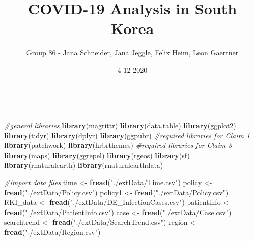 \documentclass[
]{article}
\title{COVID-19 Analysis in South Korea}
\author{Group 86 - Jana Schneider, Jana Jeggle, Felix Heim, Leon
Gaertner}
\date{4 12 2020}
\newenvironment{Shaded}{\begin{snugshade}}{\end{snugshade}}
\newcommand{\CommentTok}[1]{\textcolor[rgb]{0.56,0.35,0.01}{\textit{#1}}}
\newcommand{\KeywordTok}[1]{\textcolor[rgb]{0.13,0.29,0.53}{\textbf{#1}}}
\newcommand{\NormalTok}[1]{#1}
\newcommand{\StringTok}[1]{\textcolor[rgb]{0.31,0.60,0.02}{#1}}
\begin{document}
\maketitle

~

\begin{Shaded}
\begin{Highlighting}[]
\CommentTok{\#general libraries}
\KeywordTok{library}\NormalTok{(magrittr)}
\KeywordTok{library}\NormalTok{(data.table)}
\KeywordTok{library}\NormalTok{(ggplot2)}
\KeywordTok{library}\NormalTok{(tidyr)}
\KeywordTok{library}\NormalTok{(dplyr)}
\KeywordTok{library}\NormalTok{(ggpubr)}
\CommentTok{\#required libraries for Claim 1}
\KeywordTok{library}\NormalTok{(patchwork)}
\KeywordTok{library}\NormalTok{(hrbrthemes)}
\CommentTok{\#required libraries for Claim 3}
\KeywordTok{library}\NormalTok{(maps)}
\KeywordTok{library}\NormalTok{(ggrepel)}
\KeywordTok{library}\NormalTok{(rgeos)}
\KeywordTok{library}\NormalTok{(sf)}
\KeywordTok{library}\NormalTok{(rnaturalearth)}
\KeywordTok{library}\NormalTok{(rnaturalearthdata)}
\end{Highlighting}
\end{Shaded}

\begin{Shaded}
\begin{Highlighting}[]
\CommentTok{\#import data files}
\NormalTok{time \textless{}{-}}\StringTok{ }\KeywordTok{fread}\NormalTok{(}\StringTok{"./extData/Time.csv"}\NormalTok{)}
\NormalTok{policy \textless{}{-}}\StringTok{ }\KeywordTok{fread}\NormalTok{(}\StringTok{"./extData/Policy.csv"}\NormalTok{)}
\NormalTok{policy1 \textless{}{-}}\StringTok{ }\KeywordTok{fread}\NormalTok{(}\StringTok{"./extData/Policy.csv"}\NormalTok{)}
\NormalTok{RKI\_data \textless{}{-}}\StringTok{ }\KeywordTok{fread}\NormalTok{(}\StringTok{"./extData/DE\_InfectionCases.csv"}\NormalTok{)}
\NormalTok{patientinfo \textless{}{-}}\StringTok{ }\KeywordTok{fread}\NormalTok{(}\StringTok{"./extData/PatientInfo.csv"}\NormalTok{)}
\NormalTok{case \textless{}{-}}\StringTok{ }\KeywordTok{fread}\NormalTok{(}\StringTok{"./extData/Case.csv"}\NormalTok{)}
\NormalTok{searchtrend \textless{}{-}}\StringTok{ }\KeywordTok{fread}\NormalTok{(}\StringTok{"./extData/SearchTrend.csv"}\NormalTok{)}
\NormalTok{region \textless{}{-}}\StringTok{ }\KeywordTok{fread}\NormalTok{(}\StringTok{"./extData/Region.csv"}\NormalTok{)}
\end{Highlighting}
\end{Shaded}

~
\end{document}
